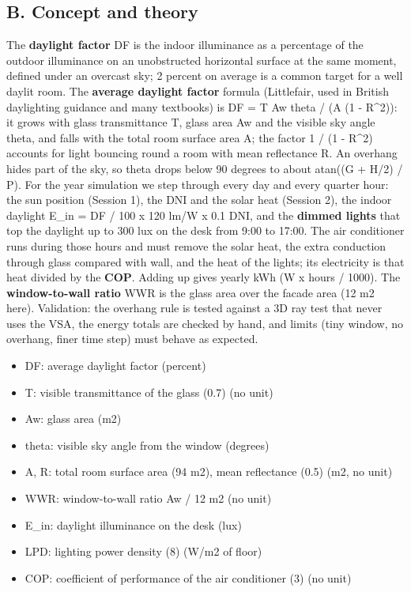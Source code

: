 \documentclass[11pt,a4paper]{article}
\begin{document}
\subsection*{B. Concept and theory}
The \textbf{daylight factor} DF is the indoor illuminance as a percentage of the outdoor illuminance on an unobstructed horizontal surface at the same moment, defined under an overcast sky; 2 percent on average is a common target for a well daylit room. The \textbf{average daylight factor} formula (Littlefair, used in British daylighting guidance and many textbooks) is DF = T Aw theta / (A (1 - R\textasciicircum{}2)): it grows with glass transmittance T, glass area Aw and the visible sky angle theta, and falls with the total room surface area A; the factor 1 / (1 - R\textasciicircum{}2) accounts for light bouncing round a room with mean reflectance R. An overhang hides part of the sky, so theta drops below 90 degrees to about atan((G + H/2) / P). For the year simulation we step through every day and every quarter hour: the sun position (Session 1), the DNI and the solar heat (Session 2), the indoor daylight E\_in = DF / 100 x 120 lm/W x 0.1 DNI, and the \textbf{dimmed lights} that top the daylight up to 300 lux on the desk from 9:00 to 17:00. The air conditioner runs during those hours and must remove the solar heat, the extra conduction through glass compared with wall, and the heat of the lights; its electricity is that heat divided by the \textbf{COP}. Adding up gives yearly kWh (W x hours / 1000). The \textbf{window-to-wall ratio} WWR is the glass area over the facade area (12 m2 here). Validation: the overhang rule is tested against a 3D ray test that never uses the VSA, the energy totals are checked by hand, and limits (tiny window, no overhang, finer time step) must behave as expected.

\begin{itemize}[nosep]
\item DF: average daylight factor (percent)
\item T: visible transmittance of the glass (0.7) (no unit)
\item Aw: glass area (m2)
\item theta: visible sky angle from the window (degrees)
\item A, R: total room surface area (94 m2), mean reflectance (0.5) (m2, no unit)
\item WWR: window-to-wall ratio Aw / 12 m2 (no unit)
\item E\_in: daylight illuminance on the desk (lux)
\item LPD: lighting power density (8) (W/m2 of floor)
\item COP: coefficient of performance of the air conditioner (3) (no unit)
\end{itemize}
\end{document}
